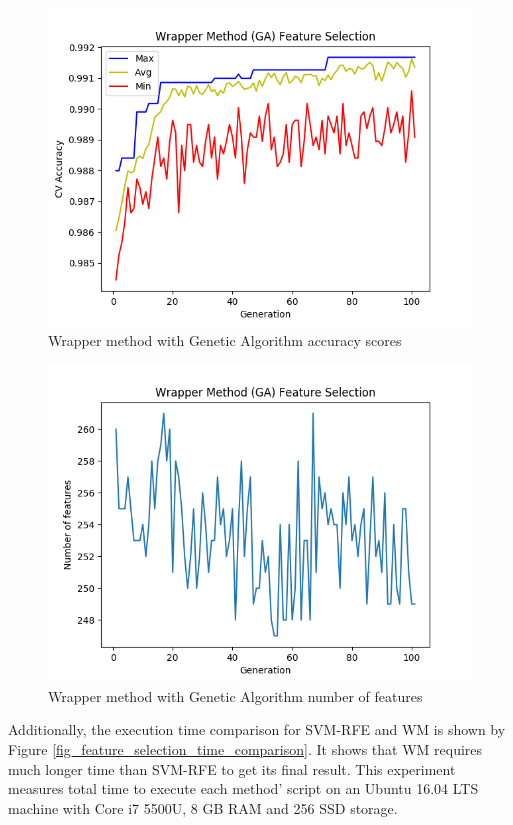 \documentclass[conference,compsoc,12pt]{IEEEtran}
\begin{document}
	\begin{figure}
		\includegraphics[scale=0.5]{../images/WM_GA_SVM_acc_chart.png}
		\caption{Wrapper method with Genetic Algorithm accuracy scores}
		\label{fig_wm_acc_chart}
	\end{figure}
	
	\begin{figure}
		\includegraphics[scale=0.5]{../images/WM_GA_SVM_feat_chart.png}
		\caption{Wrapper method with Genetic Algorithm number of features}
		\label{fig_wm_num_features_chart}
	\end{figure}
	
	Additionally, the execution time comparison for SVM-RFE and WM is shown by Figure \ref{fig_feature_selection_time_comparison}. It shows that WM requires much longer time than SVM-RFE to get its final result. This experiment measures total time to execute each method' script on an Ubuntu 16.04 LTS machine with Core i7 5500U, 8 GB RAM and 256 SSD storage.
		
\end{document}
